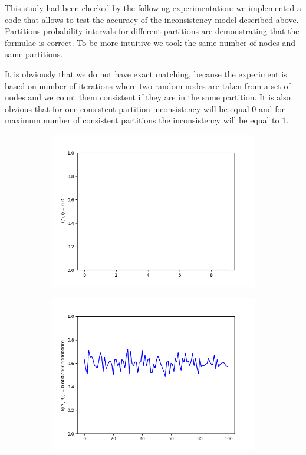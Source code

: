 \documentclass{llncs}
\begin{document}
This study had been checked by the following experimentation: we implemented a code that allows to test the accuracy of the inconsistency model described above. Partitions probability intervals for different partitions are demonstrating that the formulae is correct. To be more intuitive we took the same number of nodes and same partitions.

It is obviously that we do not have exact matching, because the experiment is based on number of iterations where two random nodes are taken from a set of nodes and we count them consistent if they are in the same partition.
It is also obvious that for one consistent partition inconsistency will be equal $0$ and for maximum number of consistent partitions the inconsistency will be equal to $1$.

\begin{figure}
\begin{subfigure}{0.5\linewidth}
\centering\includegraphics[scale=0.4]{images/1-consistent-partition.png}\hfill
\end{subfigure}
\begin{subfigure}{0.5\linewidth}
\centering\includegraphics[scale=0.4]{images/2-3-consistent-partitions-probability.png}\hfill

\end{subfigure}
\end{figure}
\end{document}
